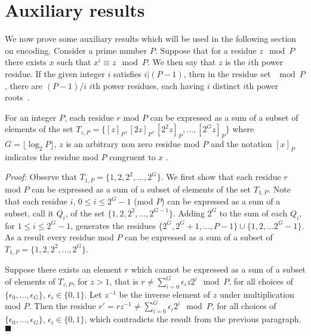 \section{Auxiliary results}\label{aux}
We now prove some auxiliary results which will be used in the
following section on encoding. Consider a prime number $P$.
Suppose that for a residue $z \mod P$ there exists $x$ such that
$x^i \equiv z \mod P$. We then say that $z$ is the $i$th power
residue. If the given integer $i$ satisfies $i |(P-1)$, then in
the residue set $\mod P$, there are $(P-1)/i$ $i$th power
residues, each having $i$ distinct $i$th power
roots~\cite{apostol}.

\begin{lemma}\label{generates} For an integer $P$, each residue $r$ mod $P$ can be expressed as a
sum of a subset of elements of the set
$T_{z,P}=\{[z]_P,[2z]_P,[2^2z]_P,...,[2^{G}z]_P\}$ where
$G=\lfloor \log_2 P \rfloor $, $z$ is an arbitrary non zero
residue mod $P$ and the notation $[x]_P$ indicates the residue mod
$P$ congruent to $x$ .
\end{lemma}

\noindent \textit{Proof:} Observe that
$T_{1,P}=\{1,2,2^2,...,2^{G}\}$. We first show that each residue
$r$ mod $P$ can be expressed as a sum of a subset of elements of
the set $T_{1,P}$. Note that each residue $i$, $0 \leq i \leq
2^G-1$ (mod $P$) can be expressed as a sum of a subset, call it
$Q_i$, of the set $\{1,2,2^2,...,2^{G-1}\}$. Adding $2^G$ to the
sum of each $Q_i$, for $1 \leq i \leq 2^G-1$, generates the
residues $\{2^G, 2^G+1,...,P-1 \}\cup \{1,2,...2^G-1\}$. As a
result every residue mod $P$ can be expressed as a sum of a subset
of $T_{1,P}=\{1,2,2^2,...,2^{G}\}$.

Suppose there exists an element $r$ which cannot be expressed as a
sum of a subset of elements of $T_{z,P}$, for $z>1$, that is $r
\neq \sum_{i=0}^G \epsilon_i z 2^i \mod P$, for all choices of
$\{\epsilon_0,...,\epsilon_G\}$, $\epsilon_i \in \{0,1\}$. Let
$z^{-1}$ be the inverse element of $z$ under multiplication mod
$P$. Then the residue $r' = rz^{-1} \neq \sum_{i=0}^G \epsilon_i
2^i \mod P$, for all choices of $\{\epsilon_0,...,\epsilon_G\}$,
$\epsilon_i \in \{0,1\}$, which contradicts the result from the
previous paragraph.\hfill$\blacksquare$

